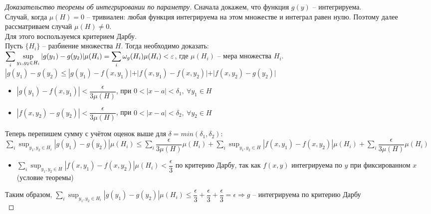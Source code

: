 \begin{proof}[Доказательство теоремы об интегрировании по параметру]
    Сначала докажем, что функция $g(y)$ -- интегрируема. \\
    Случай, когда $\mu(H) = 0$ -- тривиален: любая функция интегрируема на этом множестве 
    и интеграл равен нулю. Поэтому далее рассматриваем случай $\mu(H) \neq 0$. \\  
    Для этого воспользуемся критерием Дарбу.\\
    Пусть $\{H_i\}$ -- разбиение множества $H$. Тогда необходимо доказать: \\
    $\displaystyle \sum_{i} \sup_{y_1, y_2 \in H_i} |g(y_1) - g(y_2)| \mu(H_i) =
    \sum_{i} \omega_{g}(H_i) \mu(H_i) < \varepsilon$, где $\mu(H_i)$ -- мера множества $H_i$. \\ 
    $|g(y_1) - g(y_2) \leqslant |g(y_1) - f(x, y_1)| + |f(x, y_1) - f(x, y_2)| 
    + |f(x, y_2) - g(y_2)|$
    \begin{itemize}
        \item $|g(y_1) - f(x, y_1)| < \dfrac{\epsilon}{3 \mu(H)}$,
        при $ 0 < |x - a| < \delta_1, \ \forall y_1 \in H$
        \item $|f(x, y_2) - g(y_2)| < \dfrac{\epsilon}{3 \mu(H)}$,
        при $ 0 < |x - a| < \delta_2, \ \forall y_2 \in H$
    \end{itemize} 
    Теперь перепишем сумму с учётом оценок выше для $\delta = min(\delta_1, \delta_2)$: \\
     $\displaystyle \sum_{i} \sup_{y_1, y_2 \in H_i} |g(y_1) - g(y_2)| \mu(H_i) \leqslant
    \sum_i \dfrac{\epsilon}{3 \mu(H)} \mu(H_i) + 
    \sum_i \sup_{y_1, y_2 \in H} |f(x, y_1) - f(x, y_2)| \mu(H_i) +
    \sum_i \dfrac{\epsilon}{3 \mu(H)} \mu(H_i)$ \\
    \begin{itemize}
        \item $\displaystyle \sum_i \sup_{y_1, y_2 \in H} |f(x, y_1) - f(x, y_2)| \mu(H_i) 
        < \dfrac{\epsilon}{3}$ по критерию Дарбу, так как $f(x, y)$ интегрируема по $y$ при
        фиксированном $x$ (условие теоремы)
    \end{itemize} 
    Таким образом, $\displaystyle \sum_{i} \sup_{y_1, y_2 \in H_i} |g(y_1) - g(y_2)| \mu(H_i)
    \leqslant \dfrac{\epsilon}{3} + \dfrac{\epsilon}{3} + \dfrac{\epsilon}{3} = \epsilon
    \Rightarrow g$ -- интегрируема по критерию Дарбу \\
    

\end{proof}
